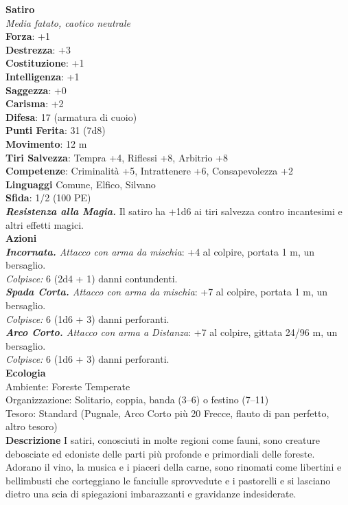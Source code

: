 \begin{multicols}{2}
\medskip\textbf{Satiro}\\
\emph{Media fatato, caotico neutrale}\\
\textbf{Forza}: +1\\
\textbf{Destrezza}: +3\\
\textbf{Costituzione}: +1\\
\textbf{Intelligenza}: +1\\
\textbf{Saggezza}: +0\\
\textbf{Carisma}: +2\\
\textbf{Difesa}: 17 (armatura di cuoio)\\
\textbf{Punti Ferita}: 31 (7d8)\\
\textbf{Movimento}: 12 m\\
\textbf{Tiri Salvezza}: Tempra +4, Riflessi +8, Arbitrio +8\\
\textbf{Competenze}: Criminalità +5, Intrattenere +6, Consapevolezza +2\\
\textbf{Linguaggi} Comune, Elfico, Silvano\\
\textbf{Sfida}: 1/2 (100 PE)\smallskip\\
\emph{\textbf{Resistenza alla Magia.}} Il satiro ha +1d6 ai tiri salvezza contro incantesimi e altri effetti magici.\\
\smallskip\textbf{Azioni}\\
\emph{\textbf{Incornata.} Attacco con arma da mischia}: +4 al colpire, portata 1 m, un bersaglio.\\
\emph{Colpisce:} 6 (2d4 + 1) danni contundenti.\\
\emph{\textbf{Spada Corta.} Attacco con arma da mischia}: +7 al colpire, portata 1 m, un bersaglio.\\
\emph{Colpisce:} 6 (1d6 + 3) danni perforanti.\\
\emph{\textbf{Arco Corto.} Attacco con arma a Distanza}: +7 al colpire, gittata 24/96 m, un bersaglio.\\
\emph{Colpisce:} 6 (1d6 + 3) danni perforanti.\\
\textbf{Ecologia}\\
Ambiente: Foreste Temperate\\
Organizzazione: Solitario, coppia, banda (3–6) o festino (7–11)\\
Tesoro: Standard (Pugnale, Arco Corto più 20 Frecce, flauto di pan perfetto, altro tesoro)\\
\textbf{Descrizione}
I satiri, conosciuti in molte regioni come fauni, sono creature debosciate ed edoniste delle parti più profonde e primordiali delle foreste. Adorano il vino, la musica e i piaceri della carne, sono rinomati come libertini e bellimbusti che corteggiano le fanciulle sprovvedute e i pastorelli e si lasciano dietro una scia di spiegazioni imbarazzanti e gravidanze indesiderate.\\


\end{multicols}
